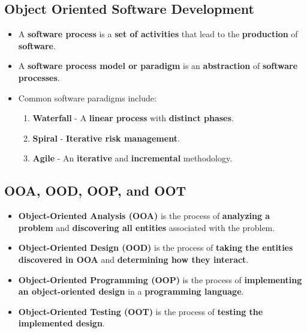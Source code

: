 \documentclass[16pt]{article}
\begin{document}
    \subsection*{Object Oriented Software Development}
    \begin{itemize}
        \item A \textbf{software process} is a \textbf{set of activities} that lead to the \textbf{production} of \textbf{software}.
        \item A \textbf{software process model or paradigm} is an \textbf{abstraction} of \textbf{software processes}.
        \item Common software paradigms include:
        \begin{enumerate}
            \item \textbf{Waterfall} - A \textbf{linear process} with \textbf{distinct phases}.
            \item \textbf{Spiral} - \textbf{Iterative risk management}.
            \item \textbf{Agile} - An \textbf{iterative} and \textbf{incremental} methodology.
        \end{enumerate}
    \end{itemize}

    \subsection*{OOA, OOD, OOP, and OOT}
    \begin{itemize}
        \item \textbf{Object-Oriented Analysis (OOA)} is the process of \textbf{analyzing a problem} and \textbf{discovering all entities} associated with the problem.
        \item \textbf{Object-Oriented Design (OOD)} is the process of \textbf{taking the entities discovered in OOA} and \textbf{determining how they interact}.
        \item \textbf{Object-Oriented Programming (OOP)} is the process of \textbf{implementing an object-oriented design} in a \textbf{programming language}.
        \item \textbf{Object-Oriented Testing (OOT)} is the process of \textbf{testing the implemented design}.
    \end{itemize}
\end{document}
